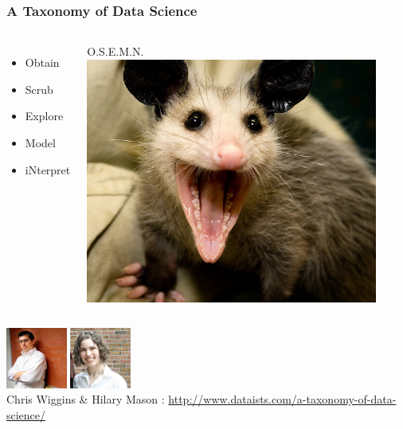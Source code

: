 \documentclass[xcolor=dvipsnames, 9pt]{beamer}
\begin{document}
\begin{frame}
    \frametitle{A Taxonomy of Data Science}
    
        
        \begin{columns}[c] 
            \begin{itemize}
                \item Obtain
                \item Scrub
                \item Explore
                \item Model
                \item iNterpret
            \end{itemize}
\huge{O.S.E.M.N.}\\
        \vspace{1em}
\includegraphics[width=0.9\textwidth]{possum.png}

\end{columns}            
\includegraphics[width=0.15\textwidth]{chris.png}
\hspace{1em}
\includegraphics[width=0.15\textwidth]{hilary.png}\\
Chris Wiggins \& Hilary Mason : \url{http://www.dataists.com/a-taxonomy-of-data-science/}
\end{frame}
\end{document}
